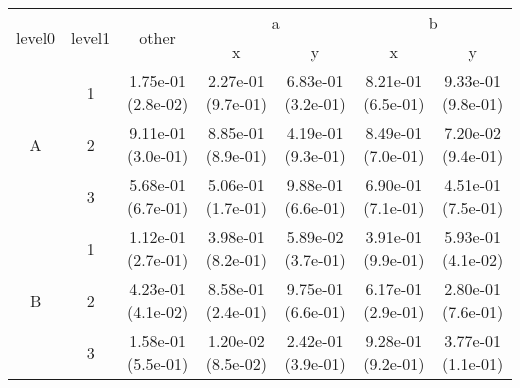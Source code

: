 \begin{tabular}{ccccccc}
\toprule
\multirow{2}{*}{level0} & \multirow{2}{*}{level1}& \multirow{2}{*}{other}&\multicolumn{2}{c}{a}&\multicolumn{2}{c}{b}\tabularnewline
\cmidrule(lr){4-5}
\cmidrule(lr){6-7}
&&&x&y&x&y\tabularnewline
\midrule
\multirow{3}{*}{A}&1& 1.75e-01 (2.8e-02)& 2.27e-01 (9.7e-01)& 6.83e-01 (3.2e-01)& 8.21e-01 (6.5e-01)& 9.33e-01 (9.8e-01)\tabularnewline
&2& 9.11e-01 (3.0e-01)& 8.85e-01 (8.9e-01)& 4.19e-01 (9.3e-01)& 8.49e-01 (7.0e-01)& 7.20e-02 (9.4e-01)\tabularnewline
&3& 5.68e-01 (6.7e-01)& 5.06e-01 (1.7e-01)& 9.88e-01 (6.6e-01)& 6.90e-01 (7.1e-01)& 4.51e-01 (7.5e-01)\tabularnewline
\midrule
\multirow{3}{*}{B}&1& 1.12e-01 (2.7e-01)& 3.98e-01 (8.2e-01)& 5.89e-02 (3.7e-01)& 3.91e-01 (9.9e-01)& 5.93e-01 (4.1e-02)\tabularnewline
&2& 4.23e-01 (4.1e-02)& 8.58e-01 (2.4e-01)& 9.75e-01 (6.6e-01)& 6.17e-01 (2.9e-01)& 2.80e-01 (7.6e-01)\tabularnewline
&3& 1.58e-01 (5.5e-01)& 1.20e-02 (8.5e-02)& 2.42e-01 (3.9e-01)& 9.28e-01 (9.2e-01)& 3.77e-01 (1.1e-01)\tabularnewline
\bottomrule
\end{tabular}
